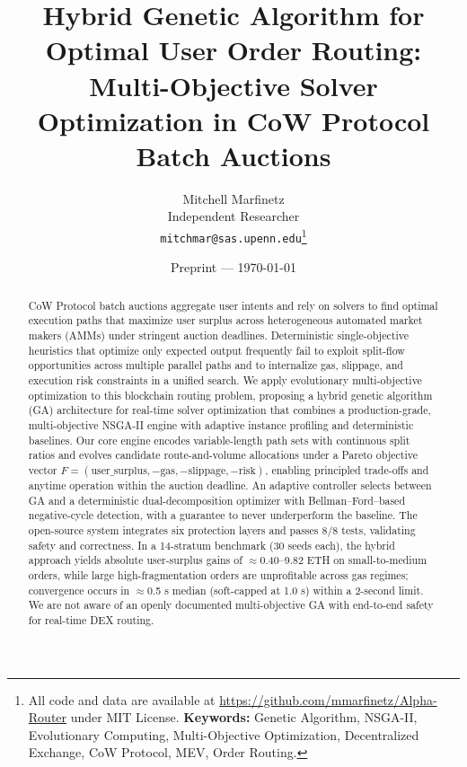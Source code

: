 \documentclass[11pt]{article}
\title{Hybrid Genetic Algorithm for Optimal User Order Routing:\\ Multi-Objective Solver Optimization in CoW Protocol Batch Auctions}
\author{Mitchell Marfinetz\\Independent Researcher\\\texttt{mitchmar@sas.upenn.edu}\thanks{All code and data are available at \url{https://github.com/mmarfinetz/Alpha-Router} under MIT License. \textbf{Keywords:} Genetic Algorithm, NSGA-II, Evolutionary Computing, Multi-Objective Optimization, Decentralized Exchange, CoW Protocol, MEV, Order Routing.}}
\date{Preprint — \today}
\newcommand{\1}{\mathbf{1}}  %
\begin{document}
\maketitle

\begin{abstract}
CoW Protocol batch auctions aggregate user intents and rely on solvers to find optimal execution paths that maximize user surplus across heterogeneous automated market makers (AMMs) under stringent auction deadlines. Deterministic single-objective heuristics that optimize only expected output frequently fail to exploit split-flow opportunities across multiple parallel paths and to internalize gas, slippage, and execution risk constraints in a unified search. We apply evolutionary multi-objective optimization to this blockchain routing problem, proposing a hybrid genetic algorithm (GA) architecture for real-time solver optimization that combines a production-grade, multi-objective NSGA-II engine with adaptive instance profiling and deterministic baselines. Our core engine encodes variable-length path sets with continuous split ratios and evolves candidate route-and-volume allocations under a Pareto objective vector $F = (\text{user\_surplus}, -\text{gas}, -\text{slippage}, -\text{risk})$, enabling principled trade-offs and anytime operation within the auction deadline. An adaptive controller selects between GA and a deterministic dual-decomposition optimizer with Bellman--Ford--based negative-cycle detection, with a guarantee to never underperform the baseline. The open-source system integrates six protection layers and passes 8/8 tests, validating safety and correctness. In a 14-stratum benchmark (30 seeds each), the hybrid approach yields absolute user-surplus gains of $\approx$0.40--9.82 ETH on small-to-medium orders, while large high-fragmentation orders are unprofitable across gas regimes; convergence occurs in $\approx$0.5 s median (soft-capped at 1.0 s) within a 2-second limit. We are not aware of an openly documented multi-objective GA with end-to-end safety for real-time DEX routing.
\end{abstract}
\end{document}

